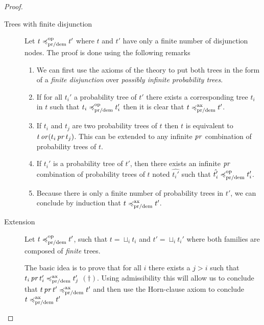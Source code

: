 \begin{proof}
\begin{itemize}
\begin{description}
      

        \item[Trees with finite disjunction]

    Let $t \preccurlyeq^{\text{op}}_{\text{pr/dem}} t'$ 
    where $t$ and $t'$ have only a finite number 
    of disjunction nodes.
    The proof is done using the following 
    remarks
    \begin{enumerate}
        \item We can first use the axioms of the theory 
            to put both trees in the form of 
            a \emph{finite disjunction} over 
            \emph{possibly infinite probability trees}.

        \item 
            If for all $t_i'$ 
            a probability
            tree of $t'$ there exists 
            a corresponding tree $t_i$ in $t$ 
            such that $t_i \preccurlyeq^{\text{op}}_{\text{pr/dem}} t_i'$
            then it is clear that $t \preccurlyeq^{\text{ax}}_{\text{pr/dem}} t'$.

        \item 
            If $t_i$ and $t_j$ are two 
            probability trees of $t$ 
            then $t$ is equivalent to 
            $t \operatorname{\mathit{or}} (t_i \operatorname{\mathit{pr}} t_j)$.
            This can be extended to any infinite 
            $\operatorname{\mathit{pr}}$ combination 
            of probability trees of $t$.

        \item 
            If $t_i'$ is a probability tree of $t'$,
            then there exists an infinite $\operatorname{\mathit{pr}}$
            combination of probability trees of $t$
            noted $\hat{t_i'}$
            such that $\hat{t_i'} \preccurlyeq^{\text{op}}_{\text{pr/dem}} t_i'$.

        \item Because there is only a finite number 
            of probability trees in $t'$, we can 
            conclude by induction that 
            $t \preccurlyeq^{\text{ax}}_{\text{pr/dem}} t'$.
    \end{enumerate}


        \item[Extension]
    Let $t \preccurlyeq^{\text{op}}_{\text{pr/dem}} t'$,
    such that $t = \sqcup_i t_i$ and $t' = \sqcup_i t_i'$ 
    where both families are composed of \emph{finite} trees.

    The basic idea is to prove that for all $i$ there exists 
    a $j > i$ such that
    $t_i \operatorname{\mathit{pr}} t_i' \preccurlyeq^{\text{ax}}_{\text{pr/dem}} t_j'$ $(\dagger)$. Using admissibility
    this will allow us to conclude that $t \operatorname{\mathit{pr}} t' \preccurlyeq^{\text{ax}}_{\text{pr/dem}} t'$
    and then use the Horn-clause axiom to conclude $t \preccurlyeq^{\text{ax}}_{\text{pr/dem}} t'$


\end{description}
\end{itemize}
\end{proof}
